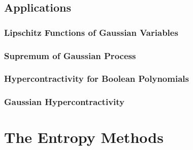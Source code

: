 \documentclass[11pt]{article}
\begin{document}
\subsection{Applications}
\subsubsection{Lipschitz Functions of Gaussian Variables}

\subsubsection{Supremum of Gaussian Process}

\subsubsection{Hypercontractivity for Boolean Polynomials}

\subsubsection{Gaussian Hypercontractivity}




\section{The Entropy Methods}
\end{document}
